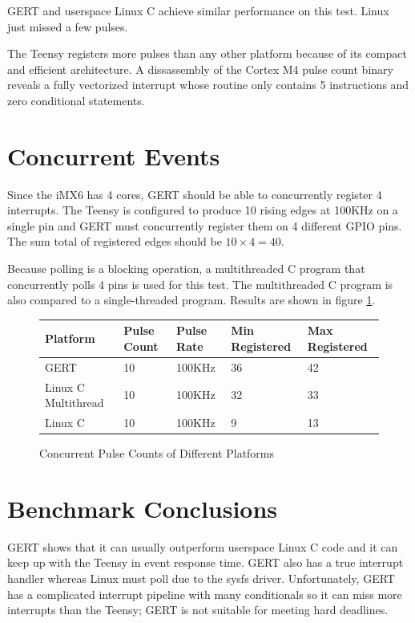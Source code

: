 GERT and userspace Linux C achieve similar performance on this test.
Linux just missed a few pulses.

The Teensy registers more pulses than any other platform because of its
compact and efficient architecture. A dissassembly of the Cortex M4 pulse count binary
reveals a fully vectorized interrupt whose routine only contains 5
instructions and zero conditional statements.

\section{Concurrent Events}\label{sec:concurrency}
Since the iMX6 has 4 cores, GERT should be able to concurrently
register 4 interrupts. The Teensy is configured to produce 10 rising edges
at 100KHz on a single pin and GERT must concurrently register them on 4 different
GPIO pins. The sum total of registered edges should be $10\times4=40$.

Because polling is a blocking operation, a multithreaded C program that concurrently
polls 4 pins is used for this test. The multithreaded C program is also compared
to a single-threaded program.
Results are shown in figure \ref{fig:ccounter}.

\begin{figure} [h]
\begin{center}
  \begin{tabular}{ | l | l | l | l | l |}
    \hline
    Platform & Pulse Count & Pulse Rate & Min Registered & Max Registered \\ \hline
    GERT & 10 & 100KHz & 36 & 42 \\ \hline
    Linux C Multithread & 10 & 100KHz & 32 & 33 \\ \hline
    Linux C & 10 & 100KHz & 9 & 13 \\ \hline
    \hline
  \end{tabular}
\end{center}
  \caption{Concurrent Pulse Counts of Different Platforms}  \label{fig:ccounter}
\end{figure}




\section{Benchmark Conclusions}

GERT shows that it can usually outperform userspace Linux C code and it
can keep up with the Teensy in event response time. GERT also has a true interrupt
handler whereas Linux must poll due to the sysfs driver. Unfortunately, GERT
has a complicated interrupt pipeline with many conditionals so it can miss
more interrupts than the Teensy; GERT is not suitable for meeting hard deadlines.

